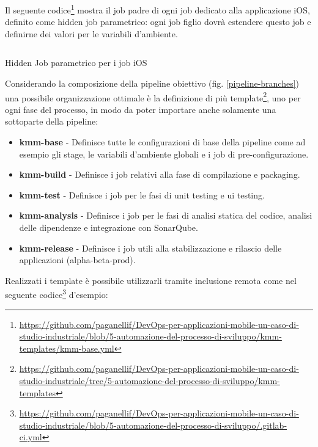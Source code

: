 Il seguente codice\footnote{\href{https://github.com/paganellif/DevOps-per-applicazioni-mobile-un-caso-di-studio-industriale/blob/5-automazione-del-processo-di-sviluppo/kmm-templates/kmm-base.yml}{https://github.com/paganellif/DevOps-per-applicazioni-mobile-un-caso-di-studio-industriale/blob/5-automazione-del-processo-di-sviluppo/kmm-templates/kmm-base.yml}} mostra il job padre di ogni job dedicato alla applicazione iOS, definito come hidden job parametrico: ogni job figlio dovrà estendere questo job e definirne dei valori per le variabili d'ambiente.

\begin{listing}[H]
    \inputminted{yaml}{code/base-ios-job.yaml}
    \caption{Hidden Job parametrico per i job iOS}
\end{listing}

Considerando la composizione della pipeline obiettivo (fig. \ref{pipeline-branches}) una possibile organizzazione ottimale è la definizione di più template\footnote{\href{https://github.com/paganellif/DevOps-per-applicazioni-mobile-un-caso-di-studio-industriale/tree/5-automazione-del-processo-di-sviluppo/kmm-templates}{https://github.com/paganellif/DevOps-per-applicazioni-mobile-un-caso-di-studio-industriale/tree/5-automazione-del-processo-di-sviluppo/kmm-templates}}, uno per ogni fase del processo, in modo da poter importare anche solamente una sottoparte della pipeline:

\begin{itemize}
    \item \textbf{kmm-base} - Definisce tutte le configurazioni di base della pipeline come ad esempio gli stage, le variabili d'ambiente globali e i job di pre-configurazione.
    \item \textbf{kmm-build} - Definisce i job relativi alla fase di compilazione e packaging.
    \item \textbf{kmm-test} - Definisce i job per le fasi di unit testing e ui testing.
    \item \textbf{kmm-analysis} - Definisce i job per le fasi di analisi statica del codice, analisi delle dipendenze e integrazione con SonarQube.
    \item \textbf{kmm-release} - Definisce i job utili alla stabilizzazione e rilascio delle applicazioni (alpha-beta-prod).
\end{itemize}

Realizzati i template è possibile utilizzarli tramite inclusione remota come nel seguente codice\footnote{\href{https://github.com/paganellif/DevOps-per-applicazioni-mobile-un-caso-di-studio-industriale/blob/5-automazione-del-processo-di-sviluppo/.gitlab-ci.yml}{https://github.com/paganellif/DevOps-per-applicazioni-mobile-un-caso-di-studio-industriale/blob/5-automazione-del-processo-di-sviluppo/.gitlab-ci.yml}} d'esempio:

